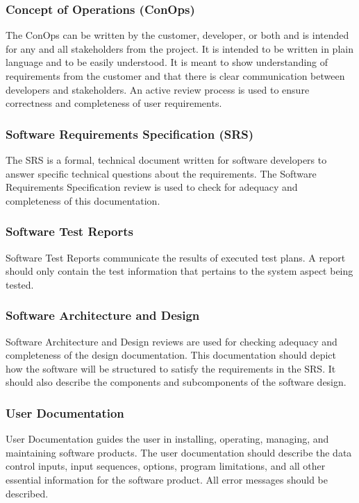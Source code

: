 \documentclass[a3paper, 11pt]{article}
\begin{document}
\subsubsection{Concept of Operations (ConOps)}
The ConOps can be written by the customer, developer, or both and is intended for any and all stakeholders from the project. It is intended to be written in plain language and to be easily understood. It is meant to show understanding of requirements from the customer and that there is clear communication between developers and stakeholders. An active review process is used to ensure correctness and completeness of user requirements. 

\subsubsection{Software Requirements Specification (SRS)}
The SRS is a formal, technical document written for software developers to answer specific technical questions about the 
requirements. The Software Requirements Specification review is used to check for adequacy and completeness of this documentation. 

\subsubsection{Software Test Reports}
Software Test Reports communicate the results of executed test plans. A report should only contain the test information that pertains to the system aspect being tested.

\subsubsection{Software Architecture and Design}
Software Architecture and Design reviews are used for checking adequacy and completeness of the design documentation. This documentation should depict how the software will be structured to satisfy the requirements in the SRS. It should also describe the components and subcomponents of the software design.

\subsubsection{User Documentation}
User Documentation guides the user in installing, operating, managing, and maintaining software products. The user documentation should describe the data control inputs, input sequences, options, program limitations, and all other essential information for the software product. All error messages should be described.
\end{document}
